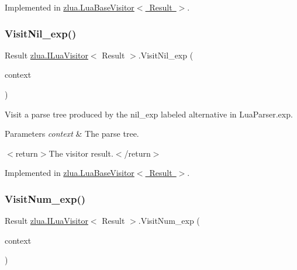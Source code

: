 Implemented in \mbox{\hyperlink{classzlua_1_1_lua_base_visitor_ac7d5334db78b99d1733e979269f5ad9a}{zlua.\+Lua\+Base\+Visitor$<$ Result $>$}}.

\mbox{\label{interfacezlua_1_1_i_lua_visitor_ae639ec945d2612029298b119ce63c23e}} 
\subsubsection{\texorpdfstring{Visit\+Nil\+\_\+exp()}{VisitNil\_exp()}}
{\footnotesize\ttfamily Result \mbox{\hyperlink{interfacezlua_1_1_i_lua_visitor}{zlua.\+I\+Lua\+Visitor}}$<$ Result $>$.Visit\+Nil\+\_\+exp (\begin{DoxyParamCaption}\item[{\mbox{[}\+Not\+Null\mbox{]} \mbox{\hyperlink{classzlua_1_1_lua_parser_1_1_nil__exp_context}{Lua\+Parser.\+Nil\+\_\+exp\+Context}}}]{context }\end{DoxyParamCaption})}



Visit a parse tree produced by the {\ttfamily nil\+\_\+exp} labeled alternative in Lua\+Parser.\+exp. 


\begin{DoxyParams}{Parameters}
{\em context} & The parse tree.\\
\hline
\end{DoxyParams}
$<$return$>$The visitor result.$<$/return$>$ 

Implemented in \mbox{\hyperlink{classzlua_1_1_lua_base_visitor_a8cf392e61aeb04b51f5dab36367615f9}{zlua.\+Lua\+Base\+Visitor$<$ Result $>$}}.

\mbox{\label{interfacezlua_1_1_i_lua_visitor_a03c4e65421aa19e91ebfa0f97dd31f82}} 
\subsubsection{\texorpdfstring{Visit\+Num\+\_\+exp()}{VisitNum\_exp()}}
{\footnotesize\ttfamily Result \mbox{\hyperlink{interfacezlua_1_1_i_lua_visitor}{zlua.\+I\+Lua\+Visitor}}$<$ Result $>$.Visit\+Num\+\_\+exp (\begin{DoxyParamCaption}\item[{\mbox{[}\+Not\+Null\mbox{]} \mbox{\hyperlink{classzlua_1_1_lua_parser_1_1_num__exp_context}{Lua\+Parser.\+Num\+\_\+exp\+Context}}}]{context }\end{DoxyParamCaption})}



